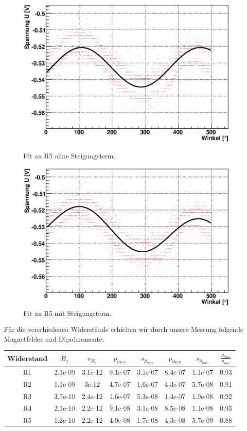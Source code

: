 \documentclass[12pt]{article}
\begin{document}
\begin{figure}[H]  
\begin{minipage}{0.49\linewidth}
\centering
\includegraphics[width=0.9\linewidth]{pictures/R5_ohne.eps}
\caption{Fit an R5 ohne Steigungsterm.}
\end{minipage}
\begin{minipage}{0.5\linewidth}
\centering 
\includegraphics[width=0.9\linewidth]{pictures/R5_mit.eps}
\caption{Fit an R5 mit Steigungsterm.}
\end{minipage}
\end{figure}

Für die verschiedenen Widerstände erhielten wir durch unsere Messung folgende Magnetfelder und Dipolmomente:
\begin{center}
\begin{tabular}{|c|cc|cc|cc|c|}
\hline
Widerstand & $B_z$ & $s_{B_z}$ & $p_{mes}$ & $s_{p_{mes}}$ & $p_{theo}$ & $s_{p_{theo}}$ & $\frac{p_{theo}}{p_{mes}}$ \\
\hline
R1 & 2.1e-09 & 3.1e-12 & 9.1e-07 & 3.1e-07 & 8.4e-07 & 1.1e-07 & 0.93 \\
R2 & 1.1e-09 & 3e-12 & 4.7e-07 & 1.6e-07 & 4.3e-07 & 5.7e-08 & 0.91 \\
R3 & 3.7e-10 & 2.4e-12 & 1.6e-07 & 5.3e-08 & 1.4e-07 & 1.9e-08 & 0.92 \\
R4 & 2.1e-10 & 2.2e-12 & 9.1e-08 & 3.1e-08 & 8.5e-08 & 1.1e-08 & 0.93 \\
R5 & 1.2e-10 & 2.2e-12 & 4.9e-08 & 1.7e-08 & 4.3e-08 & 5.7e-09 & 0.88 \\
\hline
\end{tabular}
\end{center}
\end{document}
